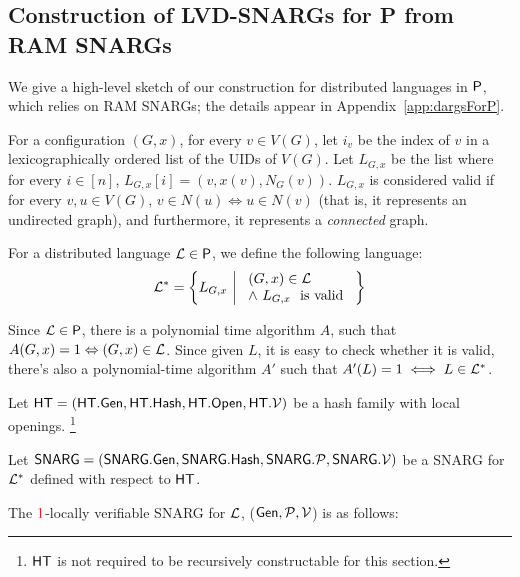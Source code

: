 \subsection{Construction of LVD-SNARGs for P from RAM SNARGs}\label{sec:dargsForP}
We give a %
high-level sketch of our construction for distributed languages in ${\mathsf{P}}$,
which relies on RAM SNARGs; the details appear in Appendix~\ref{app:dargsForP}.

For a configuration $(G,x)$, for every $v\in V(G)$, let $i_v$ be the index of $v$ in a lexicographically ordered list of the UIDs of $V(G)$. Let $L_{G,x}$ be the list where for every $i\in [n]$, $L_{G,x}[i] = (v, x(v), N_G(v))$. $L_{G,x}$ is considered valid  if for every $v,u\in V(G)$, $v\in N(u) \Leftrightarrow u\in N(v)$ (that is, it represents an undirected graph), and furthermore, it represents a \emph{connected} graph. 

For a distributed language $\mathcal{L}\in{\mathsf{P}}$, we define the following language:
\begin{gather*}
    \mathcal{L}^* = \left\{ L_{G,x} ~\middle|~ \begin{array}{ll}
         (G,x)\in\mathcal{L} \\
         \wedge ~L_{G,x}~\text{ is valid }
    \end{array} \right\}
\end{gather*}

Since $\mathcal{L}\in {\mathsf{P}}$, there is a polynomial time algorithm $A$, such that $A(G,x)=1 \Leftrightarrow (G,x)\in \mathcal{L}$. Since given $L$, it is easy to check whether it is valid, there's also a polynomial-time algorithm $A'$ such that $A'(L) = 1 \iff L\in \mathcal{L}^*$.

Let $\mathsf{HT} = (\mathsf{HT}.\mathsf{Gen}, \mathsf{HT}.\mathsf{Hash}, \mathsf{HT}.\mathsf{Open}, \mathsf{HT}.\mathcal{V})$ be a hash family with local openings.
\footnote{$\mathsf{HT}$ is not required to be recursively constructable for this section.}


Let $\mathsf{SNARG} = (\mathsf{SNARG}.\mathsf{Gen}, \mathsf{SNARG}.\mathsf{Hash}, \mathsf{SNARG}.\mathcal{P}, \mathsf{SNARG}.\mathcal{V})$ be a SNARG for $\mathcal{L}^*$ defined with respect to $\mathsf{HT}$.

The $\mathbin{\color{red}1}$-locally verifiable SNARG for $\mathcal{L}$, ($\mathsf{Gen}, \mathcal{P}, \mathcal{V}$) is as follows:

